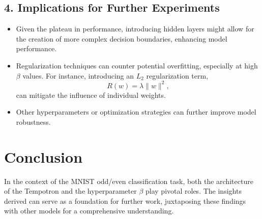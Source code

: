 \subsection*{4. Implications for Further Experiments}

\begin{itemize}
    \item Given the plateau in performance, introducing hidden layers might allow for the creation of more complex decision boundaries, enhancing model performance.
    \item Regularization techniques can counter potential overfitting, especially at high \( \beta \) values. For instance, introducing an $L_2$ regularization term, 
    \[
    R(w) = \lambda \lVert w \rVert^2,
    \]
    can mitigate the influence of individual weights.
    \item Other hyperparameters or optimization strategies can further improve model robustness.
\end{itemize}

\section*{Conclusion}

In the context of the MNIST odd/even classification task, both the architecture of the Tempotron and the hyperparameter \( \beta \) play pivotal roles. The insights derived can serve as a foundation for further work, juxtaposing these findings with other models for a comprehensive understanding.




